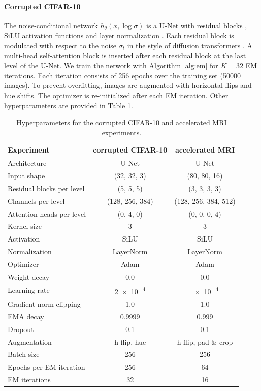 \begin{subappendices}
\paragraph{Corrupted CIFAR-10} The noise-conditional network $h_\theta(x, \log \sigma)$ is a U-Net \cite{ronneberger2015unet} with residual blocks \cite{he2016deep}, SiLU \cite{elfwing2018sigmoidweighted} activation functions and layer normalization \cite{ba2016layer}. Each residual block is modulated with respect to the noise $\sigma_t$ in the style of diffusion transformers \cite{peebles2023scalable}. A multi-head self-attention block \cite{vaswani2017attention} is inserted after each residual block at the last level of the U-Net. We train the network with Algorithm \ref{alg:em} for $K = 32$ EM iterations. Each iteration consists of \num{256} epochs over the training set (\num{50000} images). To prevent overfitting, images are augmented with horizontal flips and hue shifts. The optimizer is re-initialized after each EM iteration. Other hyperparameters are provided in Table \ref{tab:hyperparams}.

\begin{table}[h]
    \centering
    \caption{Hyperparameters for the corrupted CIFAR-10 and accelerated MRI experiments.}
    \label{tab:hyperparams}
    \begin{tabular}{l|cc}
        \toprule
        Experiment & corrupted CIFAR-10 & accelerated MRI \\
        \midrule
        Architecture & U-Net & U-Net \\
        Input shape & (32, 32, 3) & (80, 80, 16) \\
        Residual blocks per level & (5, 5, 5) & (3, 3, 3, 3) \\
        Channels per level & (128, 256, 384) & (128, 256, 384, 512) \\
        Attention heads per level & (0, 4, 0) & (0, 0, 0, 4) \\
        Kernel size & 3 & 3 \\
        Activation & SiLU & SiLU \\
        Normalization & LayerNorm & LayerNorm \\
        \midrule
        Optimizer & Adam & Adam \\
        Weight decay & 0.0 & 0.0 \\
        Learning rate & \num{2e-4} & \num{e-4} \\
        Gradient norm clipping & 1.0 & 1.0 \\
        EMA decay & 0.9999 & 0.999 \\
        Dropout & 0.1 & 0.1 \\
        Augmentation & h-flip, hue & h-flip, pad \& crop \\
        Batch size & 256 & 256 \\
        Epochs per EM iteration & 256 & 64 \\
        EM iterations & 32 & 16 \\
        \bottomrule
    \end{tabular}
\end{table}


\end{subappendices}
